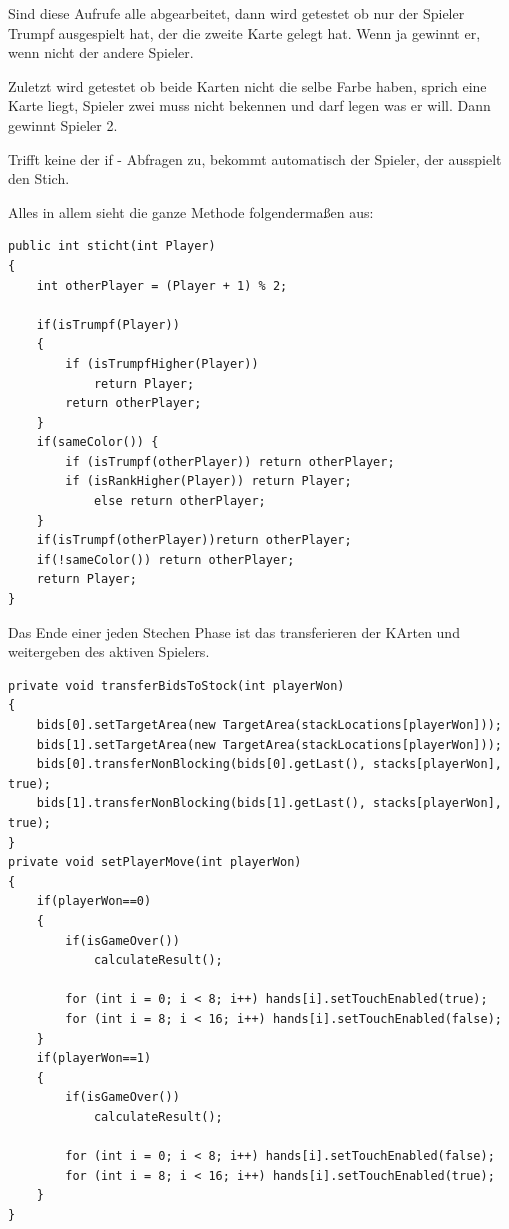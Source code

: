 Sind diese Aufrufe alle abgearbeitet, dann wird getestet ob nur der Spieler
Trumpf ausgespielt hat, der die zweite Karte gelegt hat. Wenn ja gewinnt er,
wenn nicht der andere Spieler.

Zuletzt wird getestet ob beide Karten nicht die selbe Farbe haben, sprich eine
Karte liegt, Spieler zwei muss nicht bekennen und darf legen was er will. Dann
gewinnt Spieler 2.

Trifft keine der if - Abfragen zu, bekommt automatisch der Spieler, der
ausspielt den Stich.

Alles in allem sieht die ganze Methode folgendermaßen aus:

\begin{lstlisting}[caption={sticht() Methode},captionpos=b]
public int sticht(int Player)
{
    int otherPlayer = (Player + 1) % 2;

    if(isTrumpf(Player))
    {
        if (isTrumpfHigher(Player))
            return Player;
        return otherPlayer;
    }
    if(sameColor()) {
        if (isTrumpf(otherPlayer)) return otherPlayer;
        if (isRankHigher(Player)) return Player;
            else return otherPlayer;
    }
    if(isTrumpf(otherPlayer))return otherPlayer;
    if(!sameColor()) return otherPlayer;
    return Player;
}
\end{lstlisting}

Das Ende einer jeden Stechen Phase ist das transferieren der KArten und
weitergeben des aktiven Spielers.

\begin{lstlisting}[caption={TransferBidsToStock und setPlayerMove},captionpos=b]
private void transferBidsToStock(int playerWon)
{
    bids[0].setTargetArea(new TargetArea(stackLocations[playerWon]));
    bids[1].setTargetArea(new TargetArea(stackLocations[playerWon]));
    bids[0].transferNonBlocking(bids[0].getLast(), stacks[playerWon], true);
    bids[1].transferNonBlocking(bids[1].getLast(), stacks[playerWon], true);
}
private void setPlayerMove(int playerWon)
{
    if(playerWon==0)
    {
        if(isGameOver())
            calculateResult();

        for (int i = 0; i < 8; i++) hands[i].setTouchEnabled(true);
        for (int i = 8; i < 16; i++) hands[i].setTouchEnabled(false);
    }
    if(playerWon==1)
    {
        if(isGameOver())
            calculateResult();

        for (int i = 0; i < 8; i++) hands[i].setTouchEnabled(false);
        for (int i = 8; i < 16; i++) hands[i].setTouchEnabled(true);
    }
}
\end{lstlisting}

